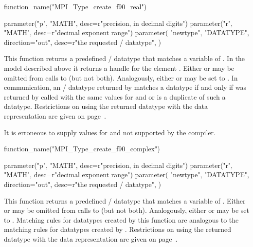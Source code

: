 \begin{mpi-binding}
    function_name("MPI_Type_create_f90_real")

    parameter("p", "MATH", desc=r"precision, in decimal digits")
    parameter("r", "MATH", desc=r"decimal exponent range")
    parameter(
        "newtype",
        "DATATYPE",
        direction="out",
        desc=r"the requested \MPI/ datatype",
    )
\end{mpi-binding}

This function returns a predefined \MPI/ datatype that matches a  variable
of  . In the model described above
it returns a handle for the element .
Either  or  may be omitted from calls to
 (but not both).  Analogously, either
 or  may be set to .
In communication, an \MPI/ datatype  returned by
 matches a datatype 
if and only if  was returned by 
called with the same values for  and  or 
is a duplicate of such a datatype.
Restrictions on using the returned datatype with the 
data
representation are given on page~\pageref{f90:kind:external32}.

It is erroneous to supply values for  and  not
supported by the compiler.



\begin{mpi-binding}
    function_name("MPI_Type_create_f90_complex")

    parameter("p", "MATH", desc=r"precision, in decimal digits")
    parameter("r", "MATH", desc=r"decimal exponent range")
    parameter(
        "newtype",
        "DATATYPE",
        direction="out",
        desc=r"the requested \MPI/ datatype",
    )
\end{mpi-binding}

This function returns a predefined \MPI/ datatype that matches a  variable
of  .
Either  or  may be omitted from calls to
\gb{} (but not both).  Analogously, either
 or  may be set to .
Matching rules for datatypes created by this function are
analogous to the matching rules for datatypes created by
.
Restrictions on using the returned datatype with the 
data
representation are given on page~\pageref{f90:kind:external32}.


